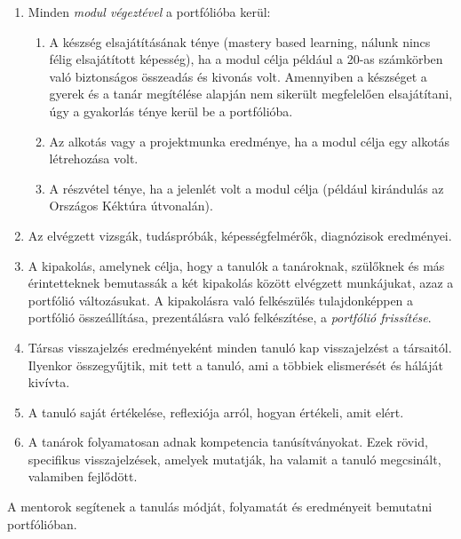 \begin{enumerate}
  \item Minden \emph{modul végeztével} a portfólióba kerül:

        \begin{enumerate}

          \item  A készség elsajátításának ténye (mastery based learning, nálunk nincs
                félig elsajátított képesség), ha a modul célja például a 20-as számkörben való
                biztonságos összeadás és kivonás volt. Amennyiben a készséget a gyerek és a
                tanár megítélése alapján nem sikerült megfelelően elsajátítani, úgy a gyakorlás
                ténye kerül be a portfólióba.
          \item Az alkotás vagy a projektmunka eredménye, ha a modul célja egy alkotás
                létrehozása volt.
          \item A részvétel ténye, ha a jelenlét volt a modul célja (például kirándulás
                az Országos Kéktúra útvonalán).

        \end{enumerate}
  \item Az elvégzett vizsgák, tudáspróbák, képességfelmérők, diagnózisok
        eredményei.

  \item A kipakolás, amelynek célja, hogy a tanulók a tanároknak, szülőknek és
        más érintetteknek bemutassák a két kipakolás között elvégzett munkájukat, azaz
        a portfólió változásukat. A kipakolásra való felkészülés tulajdonképpen a
        portfólió összeállítása, prezentálásra való felkészítése, a \emph{portfólió
          frissítése}.

  \item Társas visszajelzés eredményeként minden tanuló kap visszajelzést a
        társaitól. Ilyenkor összegyűjtik, mit tett a tanuló, ami a többiek elismerését
        és háláját kivívta.

  \item A tanuló saját értékelése, reflexiója arról, hogyan értékeli, amit elért.

  \item A tanárok folyamatosan adnak kompetencia tanúsítványokat. Ezek rövid,
        specifikus visszajelzések, amelyek mutatják, ha valamit a tanuló megcsinált,
        valamiben fejlődött.
\end{enumerate}

A mentorok segítenek a tanulás módját, folyamatát és eredményeit bemutatni
portfólióban.

